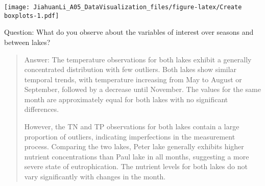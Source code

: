 \documentclass[
]{article}
\newenvironment{Shaded}{\begin{snugshade}}{\end{snugshade}}
\newcommand{\AttributeTok}[1]{\textcolor[rgb]{0.77,0.63,0.00}{#1}}
\newcommand{\DecValTok}[1]{\textcolor[rgb]{0.00,0.00,0.81}{#1}}
\newcommand{\FunctionTok}[1]{\textcolor[rgb]{0.00,0.00,0.00}{#1}}
\newcommand{\NormalTok}[1]{#1}
\newcommand{\OtherTok}[1]{\textcolor[rgb]{0.56,0.35,0.01}{#1}}
\newcommand{\SpecialCharTok}[1]{\textcolor[rgb]{0.00,0.00,0.00}{#1}}
\newcommand{\StringTok}[1]{\textcolor[rgb]{0.31,0.60,0.02}{#1}}
\begin{document}
\begin{Shaded}
\end{Shaded}

\texttt{[image: JiahuanLi\_A05\_DataVisualization\_files/figure-latex/Create boxplots-1.pdf]}

Question: What do you observe about the variables of interest over
seasons and between lakes?

\begin{quote}
Answer: The temperature observations for both lakes exhibit a generally
concentrated distribution with few outliers. Both lakes show similar
temporal trends, with temperature increasing from May to August or
September, followed by a decrease until November. The values for the
same month are approximately equal for both lakes with no significant
differences.

However, the TN and TP observations for both lakes contain a large
proportion of outliers, indicating imperfections in the measurement
process. Comparing the two lakes, Peter lake generally exhibits higher
nutrient concentrations than Paul lake in all months, suggesting a more
severe state of eutrophication. The nutrient levels for both lakes do
not vary significantly with changes in the month.
\end{quote}
\end{document}
